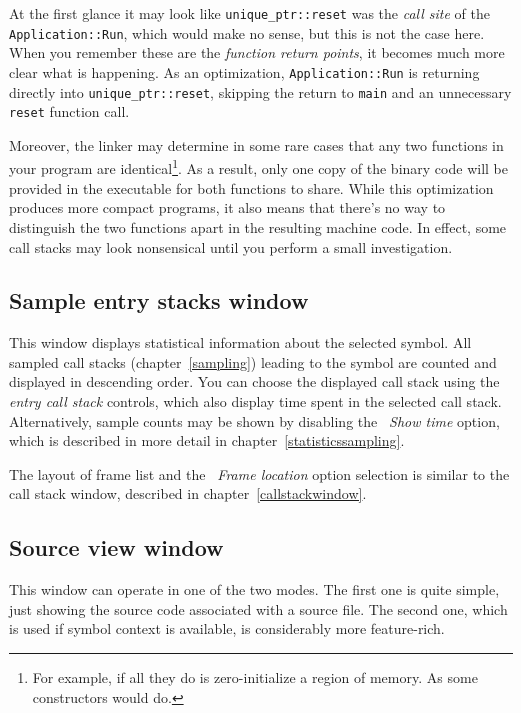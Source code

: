 \documentclass[hidelinks,titlepage,a4paper,twoside]{article}
\begin{document}
At the first glance it may look like \texttt{unique\_ptr::reset} was the \emph{call site} of the \texttt{Application::Run}, which would make no sense, but this is not the case here. When you remember these are the \emph{function return points}, it becomes much more clear what is happening. As an optimization, \texttt{Application::Run} is returning directly into \texttt{unique\_ptr::reset}, skipping the return to \texttt{main} and an unnecessary \texttt{reset} function call.

Moreover, the linker may determine in some rare cases that any two functions in your program are identical\footnote{For example, if all they do is zero-initialize a region of memory. As some constructors would do.}. As a result, only one copy of the binary code will be provided in the executable for both functions to share. While this optimization produces more compact programs, it also means that there's no way to distinguish the two functions apart in the resulting machine code. In effect, some call stacks may look nonsensical until you perform a small investigation.

\subsection{Sample entry stacks window}
\label{sampleparents}

This window displays statistical information about the selected symbol. All sampled call stacks (chapter~\ref{sampling}) leading to the symbol are counted and displayed in descending order. You can choose the displayed call stack using the \emph{entry call stack} controls, which also display time spent in the selected call stack. Alternatively, sample counts may be shown by disabling the \emph{\faStopwatch{}~Show time} option, which is described in more detail in chapter~\ref{statisticssampling}.

The layout of frame list and the \emph{\faAt{}~Frame location} option selection is similar to the call stack window, described in chapter~\ref{callstackwindow}.

\subsection{Source view window}
\label{sourceview}

This window can operate in one of the two modes. The first one is quite simple, just showing the source code associated with a source file. The second one, which is used if symbol context is available, is considerably more feature-rich.
\end{document}
